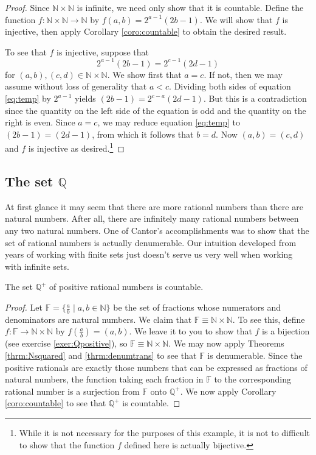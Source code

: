 \begin{proof}
Since $\mathbb N\times\mathbb N$ is infinite, we need only show that it is countable. Define the function $f:\mathbb N\times\mathbb N\to\mathbb N$ by $f(a,b)=2^{a-1}(2b-1)$.  We will show that $f$ is injective, then apply Corollary \ref{coro:countable} to obtain the desired result.

To see that $f$ is injective, suppose that
\begin{equation}\label{eq:temp}
2^{a-1}(2b-1)=2^{c-1}(2d-1)
\end{equation}
for $(a,b),(c,d)\in\mathbb N\times \mathbb N$.  We show first that $a=c$.  If not, then we may assume without loss of generality that $a<c$.  Dividing both sides of equation \ref{eq:temp} by $2^{a-1}$ yields $(2b-1)=2^{c-a}(2d-1)$.  But this is a contradiction since the quantity on the left side of the equation is odd and the quantity on the right is even.  Since $a=c$, we may reduce equation \ref{eq:temp} to $(2b-1)=(2d-1)$, from which it follows that $b=d$.  Now $(a,b)=(c,d)$ and $f$ is injective as desired.\footnote{While it is not necessary for the purposes of this example, it is not to difficult to show that the function $f$ defined here is actually bijective.}
\end{proof}

\subsection{The set $\mathbb Q$}

At first glance it may seem that there are more rational numbers than there are natural numbers.  After all, there are infinitely many rational numbers between any two natural numbers.  One of Cantor's accomplishments was to show that the set of rational numbers is actually denumerable.  Our intuition developed from years of working with finite sets just doesn't serve us very well when working with infinite sets.

\begin{lemma}\label{lemma:Qpositive}
The set $\mathbb Q^+$ of positive rational numbers is countable.
\end{lemma}

\begin{proof}
Let $\mathbb F=\{ \frac ab\mid a,b\in\mathbb N\}$ be the set of fractions whose numerators and denominators are natural numbers.  We claim that $\mathbb F\equiv\mathbb N\times \mathbb N$.  To see this, define $f:\mathbb F\to\mathbb N\times\mathbb N$ by $f\left(\frac ab\right)=(a,b)$.  We leave it to you to show that $f$ is a bijection (see exercise \ref{exer:Qpositive}), so $\mathbb F\equiv\mathbb N\times\mathbb N$.  We may now apply Theorems \ref{thrm:Nsquared} and \ref{thrm:denumtrans} to see that $\mathbb F$ is denumerable. Since the positive rationals are exactly those numbers that can be expressed as fractions of natural numbers, the function taking each fraction in $\mathbb F$ to the corresponding rational number is a surjection from $\mathbb F$ onto $\mathbb Q^+$. We now apply Corollary \ref{coro:countable} to see that $\mathbb Q^+$ is countable.
\end{proof}

